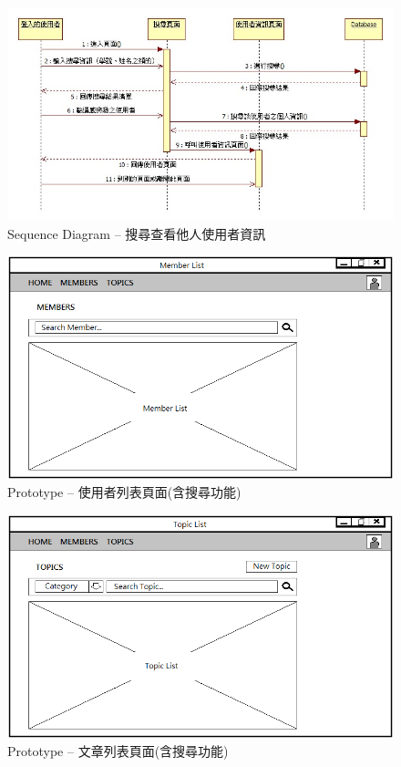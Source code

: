\begin{figure}[H]
\centering
\includegraphics[width=\textwidth]{img/useseq/stage1/seqSeqrchUser.jpg}
\caption{Sequence Diagram -- 搜尋查看他人使用者資訊}
\label{pic:seq:searchUser}
\end{figure}

\begin{figure}[H]
\centering
\includegraphics[width=.7\textwidth]{img/prototype/MemberList.png}
\caption{Prototype -- 使用者列表頁面(含搜尋功能)}
\label{pic:pro:memberList}
\end{figure}

\begin{figure}[H]
\centering
\includegraphics[width=.7\textwidth]{img/prototype/TopicList.png}
\caption{Prototype -- 文章列表頁面(含搜尋功能)}
\label{pic:pro:articleList}
\end{figure}

